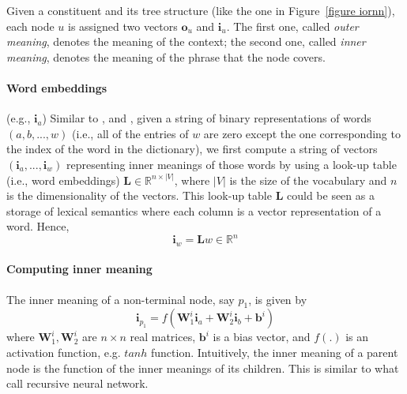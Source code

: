 \documentclass[10pt]{article}
\begin{document}
Given a constituent and its tree structure (like the one in Figure~\ref{figure iornn}), 
each node $u$ is assigned two vectors $\mathbf{o}_u$ and $\mathbf{i}_u$. The first one,
called \textit{outer meaning}, denotes the meaning of the context; the second one, 
called \textit{inner meaning}, denotes the meaning of the phrase that the node covers.

\paragraph{Word embeddings} (e.g., $\mathbf{i}_a$)
Similar to \cite{socher_learning_2010}, and \cite{collobert_natural_2011}, given a string of binary
representations of words $(a, b, ..., w)$ (i.e., all of the entries of $w$ are zero except the one 
corresponding to the index of the word in the dictionary), 
we first compute a string of vectors $(\mathbf{i}_{a},...,\mathbf{i}_{w})$ 
representing inner meanings of those words by using 
a look-up table (i.e., word embeddings) $\mathbf{L} \in \mathbb{R}^{n \times |V|}$, 
where $|V|$ is the size of the vocabulary and $n$ is the dimensionality of the vectors. 
This look-up table $\mathbf{L}$ could be seen as a storage of lexical semantics where each column 
is a vector representation of a word. Hence, 
\begin{equation}
    \label{equation compute word vector}
    \mathbf{i}_{w} = \mathbf{L} w \in \mathbb{R}^n
\end{equation}

\paragraph{Computing inner meaning} The inner meaning of a non-terminal node, say $p_1$, is given by
\begin{equation}
	\mathbf{i}_{p_1} = f(\mathbf{W}_1^i \mathbf{i}_{a} + \mathbf{W}_2^i \mathbf{i}_{b} + \mathbf{b}^i)
	\label{equation inner}
\end{equation}
where $\mathbf{W}_1^i, \mathbf{W}_2^i$ are $n \times n$ real matrices, 
$\mathbf{b}^i$ is a bias vector, and $f(.)$ is an activation function, e.g. $tanh$ 
function. Intuitively, the inner meaning of a parent node is the function of the inner meanings 
of its children. This is similar to what \cite{socher_learning_2010} call recursive neural network.
\end{document}
